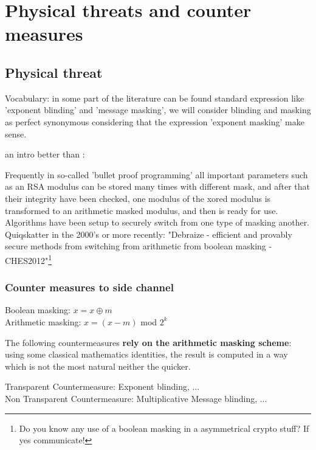 \newpage
\section{Physical threats and counter measures}

\subsection{Physical threat}


Vocabulary: in some part of the literature can be found standard expression 
like 'exponent blinding' and 'message masking', we will consider blinding and masking 
as perfect synonymous considering that the expression 'exponent masking' make sense.

an intro better than :

Frequently in so-called 'bullet proof  programming' all important parameters such as
an RSA modulus can be stored many times with different mask, and after that their integrity have been checked, one modulus of the xored modulus is transformed 
to an arithmetic masked modulus, and then is ready for use.
\vspace{3mm}
Algorithms have been setup to securely switch from one type of masking another.
Quiqskatter in the 2000's or more recently: 
"Debraize - efficient and provably secure methods from switching from arithmetic from boolean masking - CHES2012"\footnote{ Do you know any use of a boolean masking in a asymmetrical crypto stuff? If yes communicate! }

\subsubsection{Counter measures to side channel}

\begin{center}
\large
Boolean masking: $ x = x \oplus m $\\
Arithmetic masking: $ x = (x - m)$ mod $2^k$ \\
\normalsize
\end{center}

The following countermeasures \textbf{rely on the arithmetic masking scheme}:
using some classical mathematics identities, the result is computed in a 
way which is not the  most natural neither the quicker. 

Transparent Countermeasure: Exponent blinding, ...\\
Non Transparent Countermeasure: Multiplicative Message blinding, ...\\

